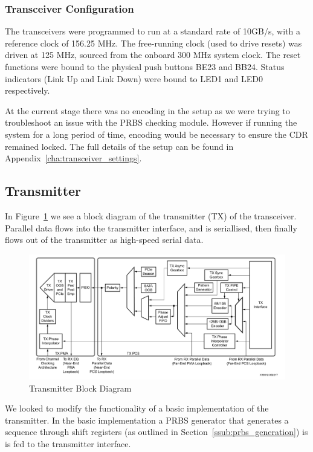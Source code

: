 \subsubsection{Transceiver Configuration}%
\label{ssub:transceiver_configuration}
The transceivers were programmed to run at a standard rate of 10GB/s, with a
reference clock of 156.25 MHz. The free-running clock (used to drive resets)
was driven at 125 MHz, sourced from the onboard 300 MHz system clock. 
The reset functions were bound to the physical push buttons BE23 and BB24. 
Status indicators (Link Up and Link Down) were bound to LED1 and LED0
respectively. 

At the current stage there was no encoding in the setup as we were trying to
troubleshoot an issue with the PRBS checking module. However if running the
system for a long period of time, encoding would be necessary to ensure the CDR
remained locked.
The full details of the setup can be found in
Appendix~\ref{cha:transceiver_settings}.


\subsection{Transmitter}%
\label{sub:transmitter}
In Figure~\ref{fig:transmitter_block} we see a block diagram of the transmitter
(TX) of the transceiver. Parallel data flows into the transmitter interface,
and is seriallised, then finally flows out of the transmitter as high-speed
serial data.

\begin{figure}[ht]
    \centering
    \hspace*{-1cm}\includegraphics[width=1.2\linewidth]{img/transmitter_block.png}
    \caption{Transmitter Block Diagram~\cite{GTY_guide} }%
    \label{fig:transmitter_block}
\end{figure}

We looked to modify the functionality of a basic implementation of the
transmitter. In the basic implementation a PRBS generator that generates a
sequence through shift registers (as outlined in
Section~\ref{ssub:prbs_generation}) is is fed to the transmitter interface. 

